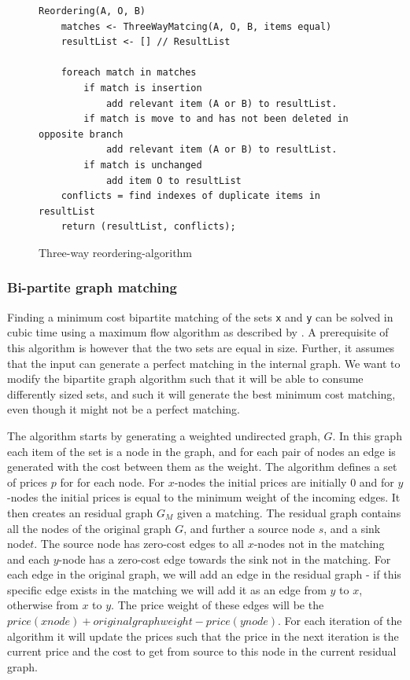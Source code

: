 \documentclass[11pt]{article}
\begin{document}
\begin{figure}
  \label{ThreeWayMatchingAlgorithm}
\begin{verbatim}
Reordering(A, O, B)
	matches <- ThreeWayMatcing(A, O, B, items equal)
	resultList <- [] // ResultList
	
	foreach match in matches
		if match is insertion
			add relevant item (A or B) to resultList.
		if match is move to and has not been deleted in opposite branch
			add relevant item (A or B) to resultList.
		if match is unchanged
			add item O to resultList
	conflicts = find indexes of duplicate items in resultList
	return (resultList, conflicts);
\end{verbatim}
\caption{Three-way reordering-algorithm}
\end{figure}

\subsubsection{Bi-partite graph matching}
Finding a minimum cost bipartite matching of the sets \texttt{x} and \texttt{y} can be solved in cubic time using a maximum flow algorithm as described by \citet{bipartitecost}. A prerequisite of this algorithm is however that the two sets are equal in size. Further, it assumes that the input can generate a perfect matching in the internal graph. We want to modify the bipartite graph algorithm such that it will be able to consume differently sized sets, and such it will generate the best minimum cost matching, even though it might not be a perfect matching.

The \citet{bipartitecost} algorithm starts by generating a weighted undirected graph, $G$. In this graph each item of the set is a node in the graph, and for each pair of nodes an edge is generated with the cost between them as the weight. The algorithm defines a set of prices $p$ for for each node. For $x$-nodes the initial prices are initially 0 and for $y$-nodes the initial prices is equal to the minimum weight of the incoming edges. It then creates an residual graph $G_M$ given a matching. The residual graph contains all the nodes of the original graph $G$, and further a source node $s$, and a sink node$t$. The source node has zero-cost edges to all $x$-nodes not in the matching and each $y$-node has a zero-cost edge towards the sink not in the matching. For each edge in the original graph, we will add an edge in the residual graph - if this specific edge exists in the matching we will add it as an edge from $y$ to $x$, otherwise from $x$ to $y$. The price weight of these edges will be the $price(xnode)+originalgraphweight-price(ynode)$. For each iteration of the algorithm it will update the prices such that the price in the next iteration is the current price and the cost to get from source to this node in the current residual graph.
\end{document}
